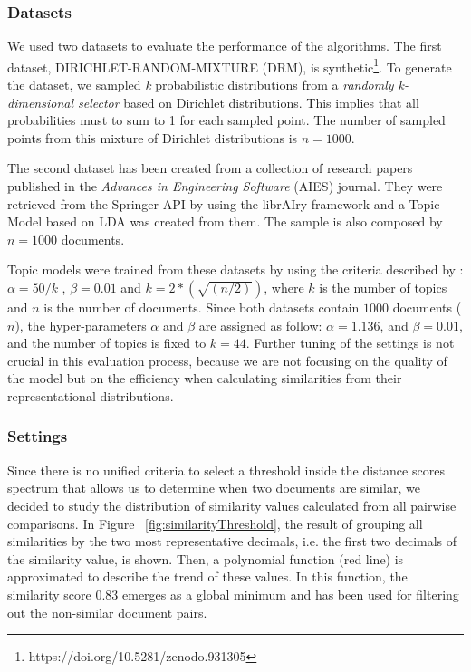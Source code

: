 \subsubsection{Datasets}
\label{sec:clustering-datasets}
We used two datasets to evaluate the performance of the algorithms. The first dataset, DIRICHLET-RANDOM-MIXTURE (DRM), is synthetic\footnote{https://doi.org/10.5281/zenodo.931305}. To generate the dataset, we sampled \textit{k} probabilistic distributions from a \textit{randomly k-dimensional selector} based on Dirichlet distributions. This implies that all probabilities must to sum to 1 for each sampled point. The number of sampled points from this mixture of Dirichlet distributions is $n=1000$.

The second dataset has been created from a collection of research papers published in the \textit{Advances in Engineering Software} (AIES) journal. They were retrieved from the Springer API by using the librAIry \citep{Badenes-Olmedo2017} framework and a Topic Model based on LDA was created from them. The sample is also composed by $n=1000$ documents.

Topic models were trained from these datasets by using the criteria described by \citep{Steyvers2006}: $\alpha= 50/k$ , $\beta= 0.01$ and $k=2*(\sqrt{(n/2)})$, where $k$ is the number of topics and $n$ is the number of documents. Since both datasets contain $1000$ documents ($n$), the hyper-parameters $\alpha$ and $\beta$ are assigned as follow: $\alpha=1.136$, and $\beta=0.01$, and the number of topics is fixed to $k=44$. Further tuning of the settings is not crucial in this evaluation process, because we are not focusing on the quality of the model but on the efficiency when calculating similarities from their representational distributions.

\subsubsection{Settings}
\label{sec:clustering-threshold}
Since there is no unified criteria to select a threshold inside the distance scores spectrum that allows us to determine when two documents are similar, we decided to study the distribution of similarity values calculated from all pairwise comparisons. In Figure ~\ref{fig:similarityThreshold}, the result of grouping all similarities by the two most representative decimals, i.e. the first two decimals of the similarity value, is shown. Then, a polynomial function (red line) is approximated to describe the trend of these values. In this function, the similarity score $0.83$ emerges as a global minimum and has been used for filtering out the non-similar document pairs.

